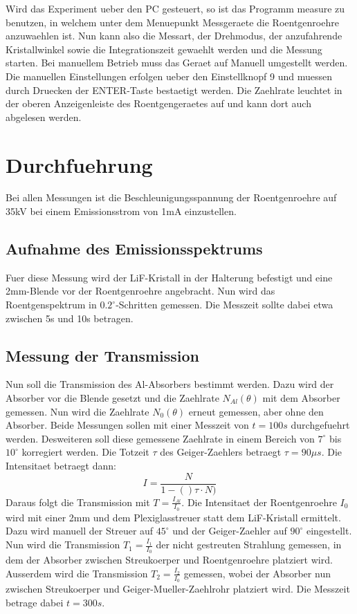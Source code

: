 \noindent Wird das Experiment ueber den PC gesteuert, so ist das Programm measure zu benutzen, in welchem unter dem Menuepunkt Messgeraete die Roentgenroehre anzuwaehlen ist. Nun kann also die Messart, der Drehmodus, der anzufahrende
Kristallwinkel sowie die Integrationszeit gewaehlt werden und die Messung starten. Bei
manuellem Betrieb muss das Geraet auf Manuell umgestellt werden. Die manuellen Einstellungen erfolgen ueber den Einstellknopf
9 und muessen durch Druecken der ENTER-Taste bestaetigt werden. Die Zaehlrate leuchtet in der oberen Anzeigenleiste des Roentgengeraetes auf und kann dort auch abgelesen werden.
\newpage \section{Durchfuehrung}
Bei allen Messungen ist die Beschleunigungsspannung der Roentgenroehre auf 35kV bei einem Emissionsstrom von 1mA einzustellen.
\subsection{Aufnahme des Emissionsspektrums}
Fuer diese Messung wird der LiF-Kristall in der Halterung befestigt und eine 2mm-Blende vor der Roentgenroehre angebracht. Nun wird das Roentgenspektrum in $0.2^{\circ}$-Schritten gemessen. Die Messzeit sollte dabei etwa zwischen 5s und 10s betragen.
\subsection{Messung der Transmission}
Nun soll die Transmission des Al-Absorbers bestimmt werden. Dazu wird der Absorber vor die Blende gesetzt und die Zaehlrate $N_{Al}(\theta)$ mit dem Absorber gemessen. Nun wird die Zaehlrate $N_0(\theta)$ erneut gemessen, aber ohne den Absorber. Beide Messungen sollen mit einer Messzeit von $t=100s$ durchgefuehrt werden. Desweiteren soll diese gemessene Zaehlrate in einem Bereich von $7^{\circ}$ bis $10^{\circ}$ korregiert werden. Die Totzeit $\tau$ des Geiger-Zaehlers betraegt $\tau=90\mu s$. Die Intensitaet betraegt dann:
\begin{equation}
    I=\frac{N}{1-()\tau\cdot N)}
\end{equation}
Daraus folgt die Transmission mit $T=\frac{I_{Al}}{I_0}$.
Die Intensitaet der Roentgenroehre $I_0$ wird mit einer 2mm und dem Plexiglasstreuer statt dem LiF-Kristall ermittelt. Dazu wird manuell der Streuer auf $45^{\circ}$ und der Geiger-Zaehler auf $90^{\circ}$ eingestellt.
Nun wird die Transmission $T_1=\frac{I_1}{I_0}$ der nicht gestreuten Strahlung gemessen, in dem der Absorber zwischen Streukoerper und Roentgenroehre platziert wird. Ausserdem wird die Transmission $T_2=\frac{I_2}{I_0}$ gemessen, wobei der Absorber nun zwischen Streukoerper und Geiger-Mueller-Zaehlrohr platziert wird. Die Messzeit betrage dabei $t=300s$.